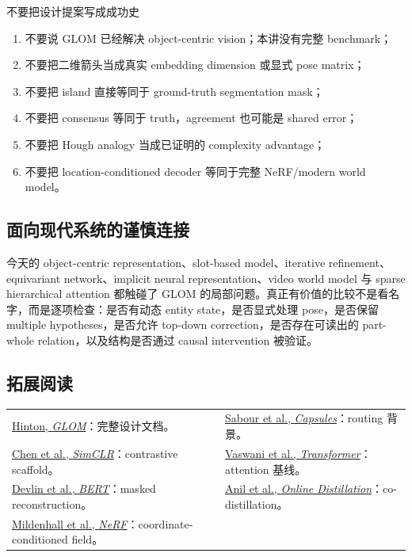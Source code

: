 \documentclass[a4paper]{article}
\begin{document}
\begin{warningbox}{不要把设计提案写成成功史}
\begin{enumerate}
  \item 不要说 GLOM 已经解决 object-centric vision；本讲没有完整 benchmark；
  \item 不要把二维箭头当成真实 embedding dimension 或显式 pose matrix；
  \item 不要把 island 直接等同于 ground-truth segmentation mask；
  \item 不要把 consensus 等同于 truth，agreement 也可能是 shared error；
  \item 不要把 Hough analogy 当成已证明的 complexity advantage；
  \item 不要把 location-conditioned decoder 等同于完整 NeRF/modern world model。
\end{enumerate}
\end{warningbox}

\subsection{面向现代系统的谨慎连接}

今天的 object-centric representation、slot-based model、iterative refinement、equivariant network、implicit neural representation、video world model 与 sparse hierarchical attention 都触碰了 GLOM 的局部问题。真正有价值的比较不是看名字，而是逐项检查：是否有动态 entity state，是否显式处理 pose，是否保留 multiple hypotheses，是否允许 top-down correction，是否存在可读出的 part-whole relation，以及结构是否通过 causal intervention 被验证。


\subsection{拓展阅读}

\begin{center}
\footnotesize
\begin{tabularx}{\textwidth}{>{\raggedright\arraybackslash}X>{\raggedright\arraybackslash}X}
\href{https://arxiv.org/abs/2102.12627}{Hinton, \emph{GLOM}}：完整设计文档。 &
\href{https://arxiv.org/abs/1710.09829}{Sabour et al., \emph{Capsules}}：routing 背景。 \\[0.25em]
\href{https://arxiv.org/abs/2002.05709}{Chen et al., \emph{SimCLR}}：contrastive scaffold。 &
\href{https://arxiv.org/abs/1706.03762}{Vaswani et al., \emph{Transformer}}：attention 基线。 \\[0.25em]
\href{https://arxiv.org/abs/1810.04805}{Devlin et al., \emph{BERT}}：masked reconstruction。 &
\href{https://arxiv.org/abs/1804.03235}{Anil et al., \emph{Online Distillation}}：co-distillation。 \\[0.25em]
\href{https://arxiv.org/abs/2003.08934}{Mildenhall et al., \emph{NeRF}}：coordinate-conditioned field。 & \\
\end{tabularx}
\end{center}
\end{document}
